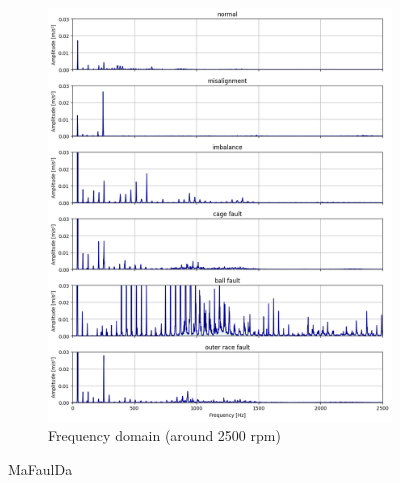 \begin{figure}[h]
\begin{subfigure}[b]{0.49\textwidth}
        \includegraphics[width=\textwidth]{assets/results/eda/mafaulda-faults.png}
        \caption{Frequency domain (around 2500 rpm)}
    \end{subfigure}
    \caption{MaFaulDa}
\end{figure}


